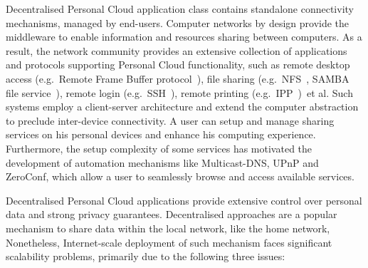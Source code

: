 Decentralised Personal Cloud application class contains standalone
connectivity mechanisms, managed by end-users.  Computer networks by design 
provide the middleware to enable information and resources sharing between
computers. As a result, the network community provides an extensive collection
of applications and protocols supporting Personal Cloud functionality, such as
remote desktop access (e.g.~Remote Frame Buffer protocol~), file
sharing (e.g.~NFS~, SAMBA file service~), remote login
(e.g.~SSH~), remote printing (e.g.~IPP~)~et al.
Such systems employ a client-server architecture and extend the computer
abstraction to preclude inter-device connectivity.  A user can setup and manage
sharing services on his personal devices and enhance his computing experience.
Furthermore, the setup complexity of some services has motivated the
development of automation mechanisms like Multicast-DNS, UPnP and ZeroConf,
which allow a user to seamlessly browse and access available services. 

Decentralised Personal Cloud applications provide extensive control over
personal data and strong privacy guarantees. Decentralised approaches are a
popular mechanism to share data  within the local network, like the home
network, Nonetheless, Internet-scale deployment of such mechanism faces
significant scalability problems, primarily due to the following three issues:

